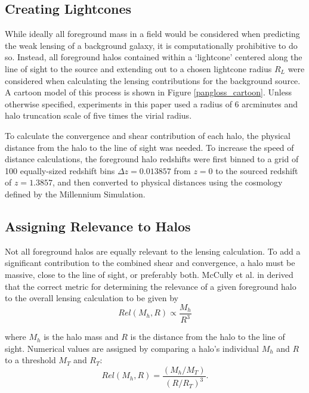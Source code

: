 \documentclass[%
 reprint,
 amsmath,amssymb,
 aps,nofootinbib
]{revtex4-1}
\begin{document}
\subsection{Creating Lightcones}

While ideally all foreground mass in a field would be considered when predicting the weak lensing of a background galaxy, it is computationally prohibitive to do so. Instead, all foreground halos contained within a `lightcone' centered along the line of sight to the source and extending out to a chosen lightcone radius $R_L$ were considered when calculating the lensing contributions for the background source. A cartoon model of this process is shown in Figure \ref{pangloss_cartoon}. Unless otherwise specified, experiments in this paper used a radius of 6 arcminutes and halo truncation scale of five times the virial radius.

To calculate the convergence and shear contribution of each halo, the physical distance from the halo to the line of sight was needed. To increase the speed of distance calculations, the foreground halo redshifts were first binned to a grid of 100 equally-sized redshift bins $\Delta z=0.013857$ from $z=0$ to the sourced redshift of $z=1.3857$, and then converted to physical distances using the cosmology defined by the Millennium Simulation.

\subsection{Assigning Relevance to Halos}

Not all foreground halos are equally relevant to the lensing calculation. To add a significant contribution to the combined shear and convergence, a halo must be massive, close to the line of sight, or preferably both. McCully et al. in \cite{mccully} derived that the correct metric for determining the relevance of a given foreground halo to the overall lensing calculation to be given by
\begin{equation}\label{relevant}
Rel(M_h,R)\propto\frac{M_h}{R^3}
\end{equation}

\noindent where $M_h$ is the halo mass and $R$ is the distance from the halo to the line of sight. Numerical values are assigned by comparing a halo's individual $M_h$ and $R$ to a threshold $M_T$ and $R_T$:
\begin{equation}\label{relevant_thresh}
Rel(M_h,R)=\frac{(M_h/M_T)}{(R/R_T)^3}.
\end{equation}
\end{document}
